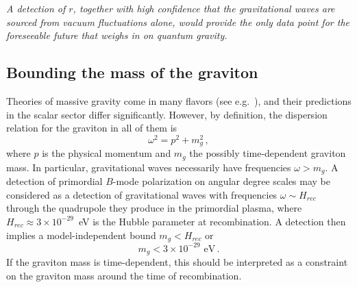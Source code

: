 {\it A detection of $r$, together with high confidence that the gravitational waves are sourced from vacuum fluctuations alone, would provide the only data point for the foreseeable future that weighs in on quantum gravity.}

\subsection{Bounding the mass of the graviton}

Theories of massive gravity come in many flavors (see e.g.~\cite{Dubovsky:2004sg,Hinterbichler:2011tt}), and their predictions in the scalar sector differ significantly. However, by definition, the dispersion relation for the graviton in all of them is
\begin{equation}
\omega^2=p^2+m_g^2\,,
\end{equation}
where $p$ is the physical momentum and $m_g$ the possibly time-dependent graviton mass. In particular, gravitational waves necessarily have frequencies $\omega>m_g$. A detection of primordial $B$-mode polarization on angular degree scales may be considered as a detection of gravitational waves with frequencies $\omega\sim H_{rec}$ through the quadrupole they produce in the primordial plasma, where $H_{rec}\approx 3\times 10^{-29}$~eV is the Hubble parameter at recombination. A detection then implies a model-independent bound $m_g<H_{rec}$ or 
\begin{equation}
m_g< 3\times 10^{-29}{\mbox{ eV}}\,.
\end{equation}
If the graviton mass is time-dependent, this should be interpreted as a constraint on the graviton mass around the time of recombination.

